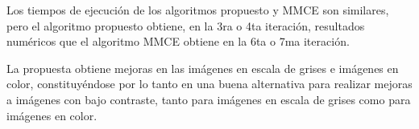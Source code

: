 
Los tiempos de ejecución de los algoritmos propuesto y MMCE son similares, pero el algoritmo propuesto obtiene, en la 3ra o 4ta iteración, resultados numéricos que el algoritmo MMCE obtiene en la 6ta o 7ma iteración.

La propuesta obtiene mejoras en las imágenes en escala de grises e imágenes en color, constituyéndose por lo tanto en una buena alternativa para realizar mejoras a imágenes con bajo contraste, tanto para imágenes en escala de grises como para imágenes en color.





